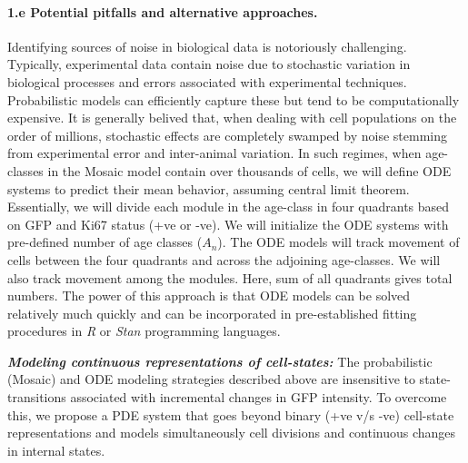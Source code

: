 \documentclass[11pt]{article}
\newcommand{\para}[1]{\vspace*{-4.5mm}\paragraph{#1}}
\begin{document}
\para{1.e Potential pitfalls and alternative approaches.}
Identifying sources of noise in biological data is notoriously challenging.
Typically, experimental data contain noise due to stochastic variation in biological processes and errors associated with experimental techniques.
Probabilistic models can efficiently capture these but tend to be computationally expensive.
It is generally belived that, when dealing with cell populations on the order of millions, stochastic effects are completely swamped by noise stemming from experimental error and inter-animal variation.
In such regimes, when age-classes in the Mosaic model contain over thousands of cells, we will %
define ODE systems to predict their mean behavior, assuming central limit theorem. 
Essentially, we will divide each module in the age-class in four quadrants based on GFP and Ki67 status (+ve or -ve). %
We will initialize the ODE systems with pre-defined number of age classes ($A_n$).
The ODE models will track movement of cells between the four quadrants and across the adjoining age-classes. %
We will also track movement among the modules.
Here, sum of all quadrants gives total numbers. %
The power of this approach is that ODE models can be solved relatively much quickly and can be incorporated in pre-established fitting procedures in \textit{R} or \textit{Stan} programming languages.

\textbf{\textit{Modeling continuous representations of cell-states:}}
The probabilistic (Mosaic) and ODE modeling strategies described above %
are insensitive to state-transitions associated with incremental changes in GFP intensity. 
To overcome this, we propose a PDE system that goes beyond binary (+ve v/s -ve) cell-state representations and models simultaneously cell divisions and continuous changes in internal states.
\end{document}
